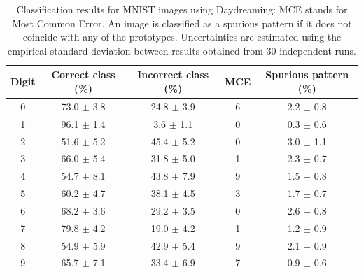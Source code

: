\documentclass[a4paper]{cas-sc}
\begin{document}
\begin{table}[h!]
    \centering
    \begin{tabular}{|c|c|c|c|c|}
        \hline
        Digit & Correct class (\%)& Incorrect class (\%)& MCE & Spurious pattern (\%) \\
        \hline
            0 & 73.0 $\pm$ 3.8 & 24.8 $\pm$ 3.9 & 6 & 2.2 $\pm$ 0.8 \\
            1 & 96.1 $\pm$ 1.4 & 3.6 $\pm$ 1.1 & 0 & 0.3 $\pm$ 0.6 \\
            2 & 51.6 $\pm$ 5.2 & 45.4 $\pm$ 5.2 & 0 & 3.0 $\pm$ 1.1 \\
            3 & 66.0 $\pm$ 5.4 & 31.8 $\pm$ 5.0 & 1 & 2.3 $\pm$ 0.7 \\
            4 & 54.7 $\pm$ 8.1 & 43.8 $\pm$ 7.9 & 9 & 1.5 $\pm$ 0.8 \\
            5 & 60.2 $\pm$ 4.7 & 38.1 $\pm$ 4.5 & 3 & 1.7 $\pm$ 0.7 \\
            6 & 68.2 $\pm$ 3.6 & 29.2 $\pm$ 3.5 & 0 & 2.6 $\pm$ 0.8 \\
            7 & 79.8 $\pm$ 4.2 & 19.0 $\pm$ 4.2 & 1 & 1.2 $\pm$ 0.9 \\
            8 & 54.9 $\pm$ 5.9 & 42.9 $\pm$ 5.4 & 9 & 2.1 $\pm$ 0.9 \\
            9 & 65.7 $\pm$ 7.1 & 33.4 $\pm$ 6.9 & 7 & 0.9 $\pm$ 0.6 \\
        \hline
    \end{tabular}
    \vspace{10pt}
    \caption{Classification results for MNIST images using Daydreaming: MCE stands for Most Common Error. An image is classified as a spurious pattern if it does not coincide with any of the prototypes. Uncertainties are estimated using the empirical standard deviation between results obtained from 30 independent runs.}
    \label{tab:classification-results-Daydreaming}
\end{table}
\end{document}
